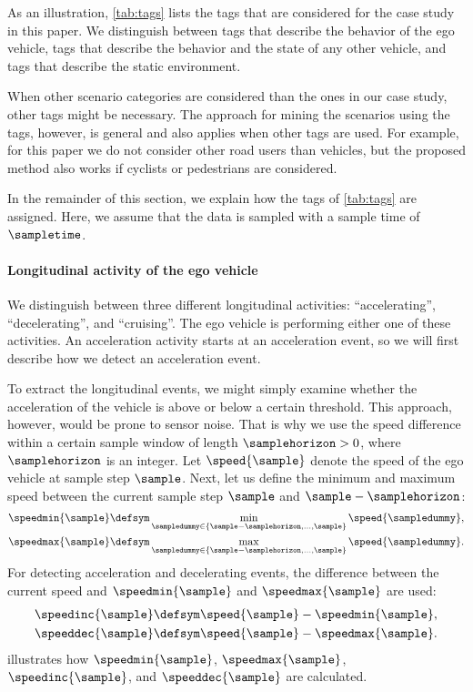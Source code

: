 As an illustration, \cref{tab:tags} lists the tags that are considered for the case study in this paper. 
We distinguish between tags that describe the behavior of the ego vehicle, tags that describe the behavior and the state of any other vehicle, and tags that describe the static environment. 
\begin{remark}
	When other scenario categories are considered than the ones in our case study, other tags might be necessary. The approach for mining the scenarios using the tags, however, is general and also applies when other tags are used. 
	For example, for this paper we do not consider other road users than vehicles, but the proposed method also works if cyclists or pedestrians are considered.
\end{remark}

In the remainder of this section, we explain how the tags of \cref{tab:tags} are assigned. 
Here, we assume that the data is sampled with a sample time of $\sampletime$.



\paragraph{Longitudinal activity of the ego vehicle}
\label{sec:longitudinal ego}

We distinguish between three different longitudinal activities: ``accelerating'', ``decelerating'', and ``cruising''. 
The ego vehicle is performing either one of these activities. 
An acceleration activity starts at an acceleration event, so we will first describe how we detect an acceleration event.

To extract the longitudinal events, we might simply examine whether the acceleration of the vehicle is above or below a certain threshold. 
This approach, however, would be prone to sensor noise. 
That is why we use the speed difference within a certain sample window of length $\samplehorizon>0$, where $\samplehorizon$ is an integer.
Let $\speed{\sample}$ denote the speed of the ego vehicle at sample step $\sample$. 
Next, let us define the minimum and maximum speed between the current sample step $\sample$ and $\sample-\samplehorizon$:
\begin{align}
\speedmin{\sample} &\defsym \min_{\sampledummy \in \left\{ \sample-\samplehorizon, \ldots, \sample \right\} } \speed{\sampledummy}, \\
\speedmax{\sample} &\defsym \max_{\sampledummy \in \left\{ \sample-\samplehorizon, \ldots, \sample \right\} } \speed{\sampledummy}.
\end{align}
For detecting acceleration and decelerating events, the difference between the current speed and $\speedmin{\sample}$ and $\speedmax{\sample}$ are used:
\begin{align}
\speedinc{\sample} &\defsym \speed{\sample} - \speedmin{\sample},\\
\speeddec{\sample} &\defsym \speed{\sample} - \speedmax{\sample}.
\end{align}
 illustrates how $\speedmin{\sample}$, $\speedmax{\sample}$, $\speedinc{\sample}$, and $\speeddec{\sample}$ are calculated.

